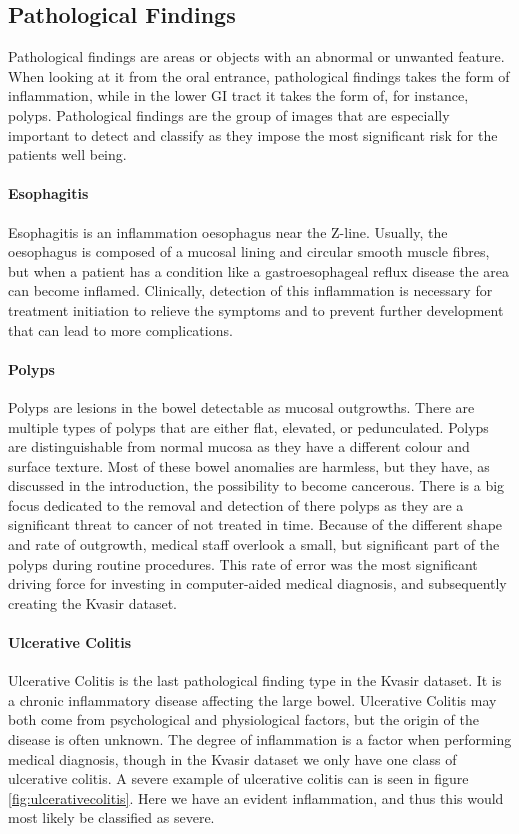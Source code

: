 \subsection{Pathological Findings}
Pathological findings are areas or objects with an abnormal or unwanted feature. When looking at it from the oral entrance, pathological findings takes the form of inflammation, while in the lower GI tract it takes the form of, for instance, polyps. 
Pathological findings are the group of images that are especially important to detect and classify as they impose the most significant risk for the patients well being. 


\paragraph{Esophagitis}
Esophagitis is an inflammation oesophagus near the Z-line. Usually, the oesophagus is composed of a mucosal lining and circular smooth muscle fibres, but when a patient has a condition like a gastroesophageal reflux disease the area can become inflamed. 
Clinically, detection of this inflammation is necessary for treatment initiation to relieve the symptoms and to prevent further development that can lead to more complications.
\cite{Goodfellow-et-al-2016}

\paragraph{Polyps}
Polyps are lesions in the bowel detectable as mucosal outgrowths. There are multiple types of polyps that are either flat, elevated, or pedunculated. Polyps are distinguishable from normal mucosa as they have a different colour and surface texture. Most of these bowel anomalies are harmless, but they have, as discussed in the introduction, the possibility to become cancerous. 
There is a big focus dedicated to the removal and detection of there polyps as they are a significant threat to cancer of not treated in time. Because of the different shape and rate of outgrowth, medical staff overlook a small, but significant part of the polyps during routine procedures. 
This rate of error was the most significant driving force for investing in computer-aided medical diagnosis, and subsequently creating the Kvasir dataset.

\paragraph{Ulcerative Colitis}
Ulcerative Colitis is the last pathological finding type in the Kvasir dataset. 
It is a chronic inflammatory disease affecting the large bowel. Ulcerative Colitis may both come from psychological and physiological factors, but the origin of the disease is often unknown. The degree of inflammation is a factor when performing medical diagnosis, though in the Kvasir dataset we only have one class of ulcerative colitis.
A severe example of ulcerative colitis can is seen in figure \ref{fig:ulcerativecolitis}. Here we have an evident inflammation, and thus this would most likely be classified as severe.




